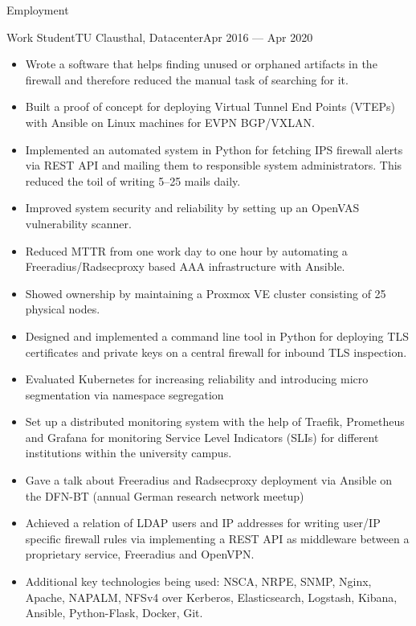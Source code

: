 \documentclass[]{mcdowellcv}
\begin{document}
\begin{cvsection}{Employment}
\begin{cvsubsection}{Work Student}{TU Clausthal, Datacenter}{Apr 2016 --- Apr 2020}
\begin{itemize}
\item Wrote a software that helps finding unused or orphaned artifacts in the firewall and therefore reduced the manual task of searching for it.
\item Built a proof of concept for deploying Virtual Tunnel End Points (VTEPs) with Ansible on Linux machines for EVPN BGP/VXLAN.
\item Implemented an automated system in Python for fetching IPS firewall alerts via REST API and mailing them to responsible system administrators. This reduced the toil of writing 5--25 mails daily.
\item Improved system security and reliability by setting up an OpenVAS vulnerability scanner.
\item Reduced MTTR from one work day to one hour by automating a Freeradius/Radsecproxy based AAA infrastructure with Ansible.
\item Showed ownership by maintaining a Proxmox VE cluster consisting of 25 physical nodes.
\item Designed and implemented a command line tool in Python for deploying TLS certificates and private keys on a central firewall for inbound TLS inspection.
\item Evaluated Kubernetes for increasing reliability and introducing micro segmentation via namespace segregation
\item Set up a distributed monitoring system with the help of Traefik, Prometheus and Grafana for monitoring Service Level Indicators (SLIs) for different institutions within the university campus.
\item Gave a talk about Freeradius and Radsecproxy deployment via Ansible on the DFN-BT (annual German research network meetup) 
\item Achieved a relation of LDAP users and IP addresses for writing user/IP specific firewall rules via implementing a REST API as middleware between a proprietary service, Freeradius and OpenVPN.
\item Additional key technologies being used: NSCA, NRPE, SNMP, Nginx, Apache, NAPALM, NFSv4 over Kerberos, Elasticsearch, Logstash, Kibana, Ansible, Python-Flask, Docker, Git.
\end{itemize}
\end{cvsubsection}


\end{cvsection}
\end{document}
